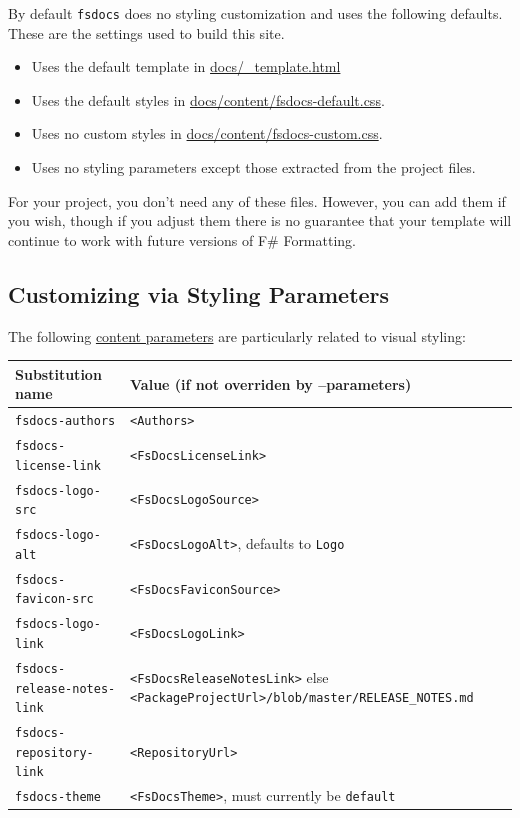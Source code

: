 \documentclass{article}
\begin{document}
By default \texttt{fsdocs} does no styling customization and uses the following defaults. These are the settings used to build
this site.
\begin{itemize}
\item 

Uses the default template
in \href{https://github.com/fsprojects/FSharp.Formatting/blob/master/docs/\_template.html}{docs/\_template.html}

\item 

Uses the default styles
in \href{https://github.com/fsprojects/FSharp.Formatting/blob/master/docs/content/fsdocs-default.css}{docs/content/fsdocs-default.css}.

\item 

Uses no custom styles
in \href{https://github.com/fsprojects/FSharp.Formatting/blob/master/docs/content/fsdocs-default.css}{docs/content/fsdocs-custom.css}.

\item 

Uses no styling parameters except those extracted from the project files.

\end{itemize}



For your project, you don't need any of these files. However, you can add them if you wish, though if
you adjust them there is no guarantee that your template will continue to work with future versions of F\# Formatting.
\subsection*{Customizing via Styling Parameters}



The following \href{content.html}{content parameters} are particularly related to visual styling:
\begin{tabular}{|l|l|}\hline
\textbf{Substitution name} & \textbf{Value (if not overriden by --parameters)}\\ \hline\hline
\texttt{fsdocs-authors} & \texttt{<Authors>}\\ \hline
\texttt{fsdocs-license-link} & \texttt{<FsDocsLicenseLink>}\\ \hline
\texttt{fsdocs-logo-src} & \texttt{<FsDocsLogoSource>}\\ \hline
\texttt{fsdocs-logo-alt} & \texttt{<FsDocsLogoAlt>}, defaults to \texttt{Logo}\\ \hline
\texttt{fsdocs-favicon-src} & \texttt{<FsDocsFaviconSource>}\\ \hline
\texttt{fsdocs-logo-link} & \texttt{<FsDocsLogoLink>}\\ \hline
\texttt{fsdocs-release-notes-link} & \texttt{<FsDocsReleaseNotesLink>} else \texttt{<PackageProjectUrl>/blob/master/RELEASE\_NOTES.md}\\ \hline
\texttt{fsdocs-repository-link} & \texttt{<RepositoryUrl>}\\ \hline
\texttt{fsdocs-theme} & \texttt{<FsDocsTheme>}, must currently be \texttt{default}\\ \hline
\end{tabular}
\end{document}

